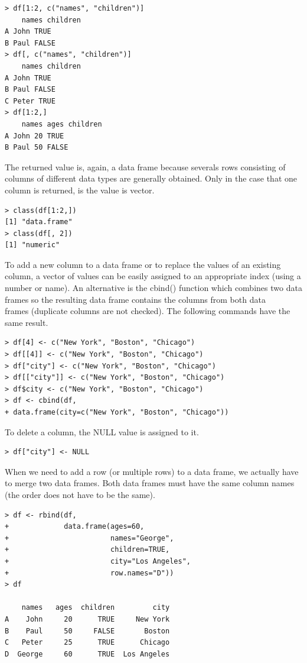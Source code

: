 \documentclass[11pt,openany,executivepaper]{book}
\begin{document}
\begin{verbatim}
> df[1:2, c("names", "children")]
    names children
A John TRUE
B Paul FALSE
> df[, c("names", "children")]
    names children
A John TRUE
B Paul FALSE
C Peter TRUE
> df[1:2,]
    names ages children
A John 20 TRUE
B Paul 50 FALSE
\end{verbatim}

The returned value is, again, a data frame because severals rows consisting of columns of different data types are generally obtained. Only in the case that one column is returned, is the value is vector.

\begin{verbatim}
> class(df[1:2,])
[1] "data.frame"
> class(df[, 2])
[1] "numeric"
\end{verbatim}

To add a new column to a data frame or to replace the values of an existing column, a vector of values can be easily assigned to an appropriate index (using a number or name). An alternative is the cbind() function which combines two data frames so the resulting data frame contains the columns from both data\\
frames (duplicate columns are not checked). The following commands have the same result.

\begin{verbatim}
> df[4] <- c("New York", "Boston", "Chicago")
> df[[4]] <- c("New York", "Boston", "Chicago")
> df["city"] <- c("New York", "Boston", "Chicago")
> df[["city"]] <- c("New York", "Boston", "Chicago")
> df$city <- c("New York", "Boston", "Chicago")
> df <- cbind(df,
+ data.frame(city=c("New York", "Boston", "Chicago"))
\end{verbatim}

To delete a column, the NULL value is assigned to it.

\begin{verbatim}
> df["city"] <- NULL
\end{verbatim}

When we need to add a row (or multiple rows) to a data frame, we actually have to merge two data frames. Both data frames must have the same column names (the order does not have to be the same).

\begin{verbatim}
> df <- rbind(df,
+             data.frame(ages=60,
+                        names="George",
+                        children=TRUE,
+                        city="Los Angeles",
+                        row.names="D"))
> df

    names   ages  children         city
A    John     20      TRUE     New York
B    Paul     50     FALSE       Boston
C   Peter     25      TRUE      Chicago
D  George     60      TRUE  Los Angeles
\end{verbatim}
\end{document}
